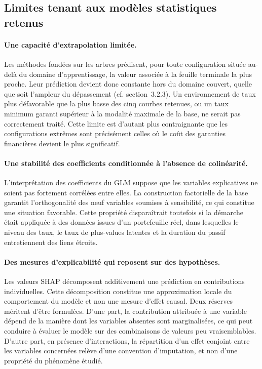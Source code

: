 \subsection{Limites tenant aux modèles statistiques retenus}

\paragraph{Une capacité d'extrapolation limitée.} Les méthodes fondées sur les arbres prédisent, pour toute configuration située au-delà du domaine d'apprentissage, la valeur associée à la feuille terminale la plus proche. Leur prédiction devient donc constante hors du domaine couvert, quelle que soit l'ampleur du dépassement (cf. section~3.2.3). Un environnement de taux plus défavorable que la plus basse des cinq courbes retenues, ou un taux minimum garanti supérieur à la modalité maximale de la base, ne serait pas correctement traité. Cette limite est d'autant plus contraignante que les configurations extrêmes sont précisément celles où le coût des garanties financières devient le plus significatif.

\paragraph{Une stabilité des coefficients conditionnée à l'absence de colinéarité.} L'interprétation des coefficients du GLM suppose que les variables explicatives ne soient pas fortement corrélées entre elles. La construction factorielle de la base garantit l'orthogonalité des neuf variables soumises à sensibilité, ce qui constitue une situation favorable. Cette propriété disparaîtrait toutefois si la démarche était appliquée à des données issues d'un portefeuille réel, dans lesquelles le niveau des taux, le taux de plus-values latentes et la duration du passif entretiennent des liens étroits.

\paragraph{Des mesures d'explicabilité qui reposent sur des hypothèses.} Les valeurs SHAP décomposent additivement une prédiction en contributions individuelles. Cette décomposition constitue une approximation locale du comportement du modèle et non une mesure d'effet causal. Deux réserves méritent d'être formulées. D'une part, la contribution attribuée à une variable dépend de la manière dont les variables absentes sont marginalisées, ce qui peut conduire à évaluer le modèle sur des combinaisons de valeurs peu vraisemblables. D'autre part, en présence d'interactions, la répartition d'un effet conjoint entre les variables concernées relève d'une convention d'imputation, et non d'une propriété du phénomène étudié.

